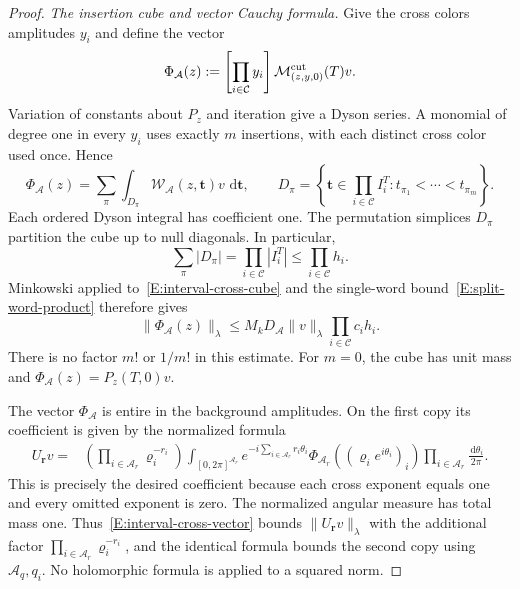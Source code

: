 \documentclass[12pt]{article}
\numberwithin{equation}{section}
\theoremstyle{definition}
\newcommand{\ud}{\,\mathrm{d}}
\begin{document}
\begin{proof}
  \emph{The insertion cube and vector Cauchy formula.}
  Give the cross colors amplitudes $y_i$ and define the vector
  \[
    \Phi_{\mathcal A}(z)
    :=\left[\prod_{i\in\mathcal C}y_i\right]
    \mathcal M^{\rm cut}_{(z,y,0)}(T)v.
  \]
  Variation of constants about $P_z$ and iteration give a Dyson series.
  A monomial of degree one in every $y_i$ uses exactly $m$ insertions,
  with each distinct cross color used once. Hence
  \begin{equation}\label{E:interval-cross-cube}
    \Phi_{\mathcal A}(z)
    =\sum_{\pi}\int_{D_\pi}
    \mathcal W_{\mathcal A}(z,\boldsymbol t)v\,\ud\boldsymbol t,
    \qquad
    D_\pi=\left\{\boldsymbol t\in\prod_{i\in\mathcal C}I_i^T:
    t_{\pi_1}<\cdots<t_{\pi_m}\right\}.
  \end{equation}
  Each ordered Dyson integral has coefficient one. The permutation
  simplices $D_\pi$ partition the cube up to null diagonals. In particular,
  \[
    \sum_\pi |D_\pi|=\prod_{i\in\mathcal C}|I_i^T|
    \le\prod_{i\in\mathcal C}h_i.
  \]
  Minkowski applied to~\eqref{E:interval-cross-cube} and the single-word
  bound~\eqref{E:split-word-product} therefore gives
  \begin{equation}\label{E:interval-cross-vector}
    \|\Phi_{\mathcal A}(z)\|_\lambda
    \le M_kD_{\mathcal A}\|v\|_\lambda
    \prod_{i\in\mathcal C}c_i h_i.
  \end{equation}
  There is no factor $m!$ or $1/m!$ in this estimate. For $m=0$,
  the cube has unit mass and $\Phi_{\mathcal A}(z)=P_z(T,0)v$.

  The vector $\Phi_{\mathcal A}$ is entire in the background amplitudes.
  On the first copy its coefficient is given by the normalized formula
  \begin{equation}\label{E:split-vector-cauchy}
    \begin{split}
      U_{\boldsymbol r}v
      ={}&\left(\prod_{i\in\mathcal A_r}\varrho_i^{-r_i}\right)
      \int_{[0,2\pi]^{\mathcal A_r}}
      e^{-i\sum_{i\in\mathcal A_r}r_i\theta_i}
      \Phi_{\mathcal A_r}((\varrho_i e^{i\theta_i})_i)
      \prod_{i\in\mathcal A_r}\frac{\ud\theta_i}{2\pi}.
    \end{split}
  \end{equation}
  This is precisely the desired coefficient because each cross exponent
  equals one and every omitted exponent is zero. The normalized angular
  measure has total mass one. Thus~\eqref{E:interval-cross-vector}
  bounds $\|U_{\boldsymbol r}v\|_\lambda$ with the additional factor
  $\prod_{i\in\mathcal A_r}\varrho_i^{-r_i}$, and the identical
  formula bounds the second copy using $\mathcal A_q,q_i$.
  No holomorphic formula is applied to a squared norm.


\end{proof}
\end{document}
